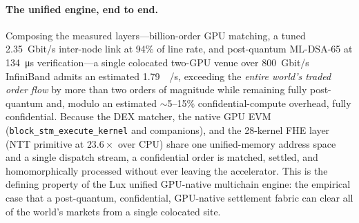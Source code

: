 \paragraph{The unified engine, end to end.} Composing the measured layers---billion-order GPU
matching, a tuned \SI{2.35}{\giga bit/\second} inter-node link at 94\% of line rate, and
post-quantum ML-DSA-65 at \SI{134}{\micro\second} verification---a single colocated two-GPU
venue over \SI{800}{\giga bit/\second} InfiniBand admits an estimated
\SI{1.79}{\giga{}/\second}, exceeding the \emph{entire world's traded order flow} by
more than two orders of magnitude while remaining fully post-quantum and, modulo an estimated
$\sim$5--15\% confidential-compute overhead, fully confidential. Because the DEX matcher, the
native GPU EVM (\texttt{block\_stm\_execute\_kernel} and companions), and the 28-kernel FHE layer
(NTT primitive at $23.6\times$ over CPU) share one unified-memory address space and a single
dispatch stream, a confidential order is matched, settled, and homomorphically processed without
ever leaving the accelerator. This is the defining property of the Lux unified GPU-native
multichain engine: the empirical case that a post-quantum, confidential, GPU-native settlement
fabric can clear all of the world's markets from a single colocated site.

